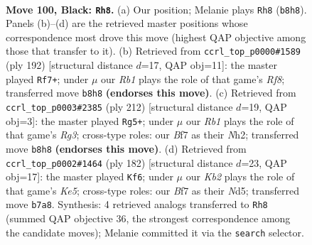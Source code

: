 \documentclass[11pt]{article}
\begin{document}
\clearpage

\begin{figure}[p]\centering
\begin{subfigure}{0.46\textwidth}\centering
\resizebox{\linewidth}{!}{%
\newchessgame
\chessboard[
  setfen={1r6/1k3bR1/5R2/8/8/5K2/8/8 b - - 3 100},
  showmover=false,
  pgfstyle=straightmove, color=movearrow, markmove={b8-h8}
]}
\caption{}
\end{subfigure}\hfill
\begin{subfigure}{0.46\textwidth}\centering
\resizebox{\linewidth}{!}{%
\newchessgame
\chessboard[
  setfen={5R2/3k4/8/8/PK6/2B1r3/8/3r4 w - - 30 97},
  showmover=false,
  pgfstyle=straightmove, color=movearrow, markmove={f8-f7}
]}
\caption{}
\end{subfigure}
\\[4pt]
\begin{subfigure}{0.46\textwidth}\centering
\resizebox{\linewidth}{!}{%
\newchessgame
\chessboard[
  setfen={8/5r2/8/4k3/8/6RK/r6N/8 w - - 84 107},
  showmover=false,
  pgfstyle=straightmove, color=movearrow, markmove={g3-g5}
]}
\caption{}
\end{subfigure}\hfill
\begin{subfigure}{0.46\textwidth}\centering
\resizebox{\linewidth}{!}{%
\newchessgame
\chessboard[
  setfen={8/8/8/r2NKR2/7r/6k1/8/8 w - - 24 92},
  showmover=false,
  pgfstyle=straightmove, color=movearrow, markmove={e5-f6}
]}
\caption{}
\end{subfigure}
\caption{\textbf{Move 100, Black: \texttt{Rh8}.} (a) Our position; Melanie plays \texttt{Rh8} (\texttt{b8h8}). Panels (b)--(d) are the retrieved master positions whose correspondence most drove this move (highest QAP objective among those that transfer to it). (b) Retrieved from \texttt{ccrl\_top\_p0000\#1589} (ply 192) [structural distance $d$=17, QAP obj=11]: the master played \texttt{Rf7+}; under $\mu$ our \emph{Rb1} plays the role of that game's \emph{Rf8}; transferred move \texttt{b8h8} \textbf{(endorses this move)}. (c) Retrieved from \texttt{ccrl\_top\_p0003\#2385} (ply 212) [structural distance $d$=19, QAP obj=3]: the master played \texttt{Rg5+}; under $\mu$ our \emph{Rb1} plays the role of that game's \emph{Rg3}; cross-type roles: our \emph{B}f7 as their \emph{N}h2; transferred move \texttt{b8h8} \textbf{(endorses this move)}. (d) Retrieved from \texttt{ccrl\_top\_p0002\#1464} (ply 182) [structural distance $d$=23, QAP obj=17]: the master played \texttt{Kf6}; under $\mu$ our \emph{Kb2} plays the role of that game's \emph{Ke5}; cross-type roles: our \emph{B}f7 as their \emph{N}d5; transferred move \texttt{b7a8}. Synthesis: 4 retrieved analogs transferred to \texttt{Rh8} (summed QAP objective 36, the strongest correspondence among the candidate moves); Melanie committed it via the \texttt{search} selector.}
\label{fig:thought-m199}
\end{figure}
\end{document}
